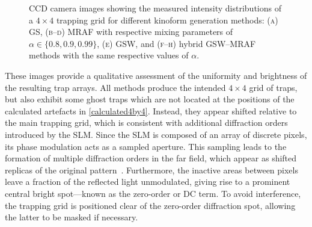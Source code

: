 \documentclass[../Thesis-IJspeert.tex]{subfiles}
\begin{document}
\begin{figure}[t]
	\caption[Measured intensity distributions of a $4\times4$ trapping grid for different kinoform generation methods]{CCD camera images showing the measured intensity distributions of a $4\times4$ trapping grid for different kinoform generation methods: \textsc{(a)} GS, \textsc{(b--d)} MRAF with respective mixing parameters of $\alpha \in \{0.8, 0.9, 0.99\}$, \textsc{(e)} GSW, and \textsc{(f--h)} hybrid GSW--MRAF methods with the same respective values of $\alpha$.}
	\label{measured4by4}
\end{figure}
These images provide a qualitative assessment of the uniformity and brightness of the resulting trap arrays. All methods produce the intended $4 \times 4$ grid of traps, but also exhibit some ghost traps which are not located at the positions of the calculated artefacts in \autoref{calculated4by4}. Instead, they appear shifted relative to the main trapping grid, which is consistent with additional diffraction orders introduced by the SLM. Since the SLM is composed of an array of discrete pixels, its phase modulation acts as a sampled aperture. This sampling leads to the formation of multiple diffraction orders in the far field, which appear as shifted replicas of the original pattern~\cite{Agour2009}. Furthermore, the inactive areas between pixels leave a fraction of the reflected light unmodulated, giving rise to a prominent central bright spot---known as the zero-order or DC term. To avoid interference, the trapping grid is positioned clear of the zero-order diffraction spot, allowing the latter to be masked if necessary.
\end{document}

